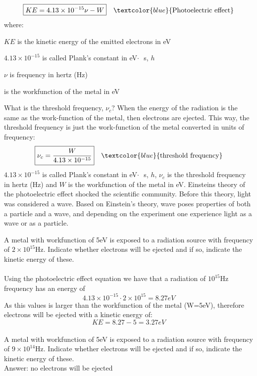 \documentclass[main.tex]{subfiles}
\begin{document}
\begin{description}
\begin{equation*}
\boxed{  KE=4.13\times 10^{-15}\nu -W  } \quad \textcolor{blue}{\text{Photoelectric effect}}
\end{equation*}
where:
\begin{where}
 \item $KE$   is the kinetic energy of the emitted electrons in eV
  \item $4.13\times 10^{-15}$ is called Plank's constant in eV$\cdot\text{ }$s, $h$
 \item $\nu$  is frequency in hertz (Hz)
 \item is the workfunction of the metal in eV
\end{where}
What is the threshold frequency, $\nu_c$? When the energy of the radiation is the same as the work-function of the metal, then electrons are ejected. This way, the threshold frequency is just the work-function of the metal converted in units of frequency:
\begin{equation*}
\boxed{ \nu_c =\frac{W}{4.13\times 10^{-15}}  } \quad \textcolor{blue}{\text{threshold frequency}}
\end{equation*}
$4.13\times 10^{-15}$ is called Plank's constant in eV$\cdot\text{ }$s, $h$, $\nu_c$  is the threshold frequency in hertz (Hz) and $W$ is the workfunction of the metal in eV.
Einsteins theory of the photoelectric effect shocked the scientific community. Before this theory, light was considered a wave. Based on Einstein's theory, wave poses properties of both a particle and a wave, and depending on the experiment one experience light as a wave or as a particle.






\begin{example} %
A metal with workfunction of 5eV is exposed to a radiation source with frequency of $2\times 10^{15}$Hz. Indicate whether electrons will be ejected and if so, indicate the kinetic energy of these. \\
\\
Using the photoelectric effect equation we have that a radiation of $10^{15}$Hz frequency has an energy of 
\[4.13\times 10^{-15} \cdot 2\times 10^15=8.27eV\]
As this values is larger than the workfunction of the metal (W=5eV), therefore electrons will be ejected with a kinetic energy of:
\[KE=8.27-5=3.27eV\]
\faDiamond\ \\
A metal with workfunction of 5eV is exposed to a radiation source with frequency of $9\times 10^{14}$Hz. Indicate whether electrons will be ejected and if so, indicate the kinetic energy of these. \\
\flushright Answer: no electrons will be ejected
\end{example}%








\end{description}
 
\end{document}
